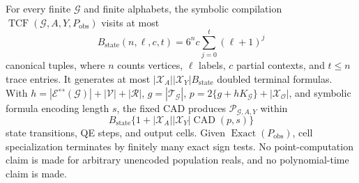 For every finite \(\mathcal G\) and finite alphabets, the symbolic compilation \(\operatorname{TCF}(\mathcal G,A,Y,P_{\mathrm{obs}})\) visits at most
\[
B_{\mathrm{state}}(n,\ell,c,t)=6^n c\sum_{j=0}^{t}(\ell+1)^j
\]
canonical tuples, where \(n\) counts vertices, \(\ell\) labels, \(c\) partial contexts, and \(t\leq n\) trace entries. It generates at most \(|\mathcal X_A||\mathcal X_Y|B_{\mathrm{state}}\) doubled terminal formulas. With \(h=|\mathcal E^{\leftrightarrow}(\mathcal G)|+|\mathcal V|+|\mathcal R|\), \(g=|\mathcal T_{\mathcal G}|\), \(p=2\{g+hK_{\mathcal G}\}+|\mathcal X_{\mathcal O}|\), and symbolic formula encoding length \(s\), the fixed CAD produces \(\mathscr P_{\mathcal G,A,Y}\) within
\[
B_{\mathrm{state}}\{1+|\mathcal X_A||\mathcal X_Y|\operatorname{CAD}(p,s)\}
\]
state transitions, QE steps, and output cells. Given \(\operatorname{Exact}(P_{\mathrm{obs}})\), cell specialization terminates by finitely many exact sign tests. No point-computation claim is made for arbitrary unencoded population reals, and no polynomial-time claim is made.